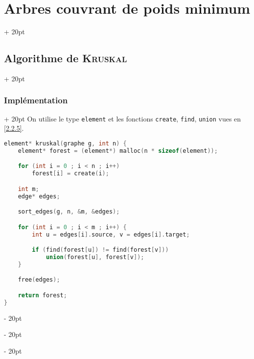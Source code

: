 \documentclass[a4paper, 12pt, twoside]{article}
\newcommand{\ind}[1][20pt]{\advance\leftskip + #1}
\newcommand{\deind}[1][20pt]{\advance\leftskip - #1}
\newenvironment{indt}[2][20pt]{#2 \par \ind[#1]}{\par \deind} %
\begin{document}
\begin{indt}{\section{Arbres couvrant de poids minimum}}
\begin{indt}{\subsection{Algorithme de \textsc{Kruskal}}}
\begin{indt}{\subsubsection{Implémentation}}
                On utilise le type \texttt{element} et les fonctions \texttt{create}, \texttt{find}, \texttt{union} vues en \ref{2.2.5}.

                \begin{lstlisting}[language=C, xleftmargin=80pt]
element* kruskal(graphe g, int n) {
    element* forest = (element*) malloc(n * sizeof(element));

    for (int i = 0 ; i < n ; i++)
        forest[i] = create(i);

    int m;
    edge* edges;

    sort_edges(g, n, &m, &edges);

    for (int i = 0 ; i < m ; i++) {
        int u = edges[i].source, v = edges[i].target;

        if (find(forest[u]) != find(forest[v]))
            union(forest[u], forest[v]);
    }

    free(edges);

    return forest;
}
                \end{lstlisting}
            \end{indt}
        \end{indt}
    \end{indt}

    \vspace{12pt}
    
\end{document}

